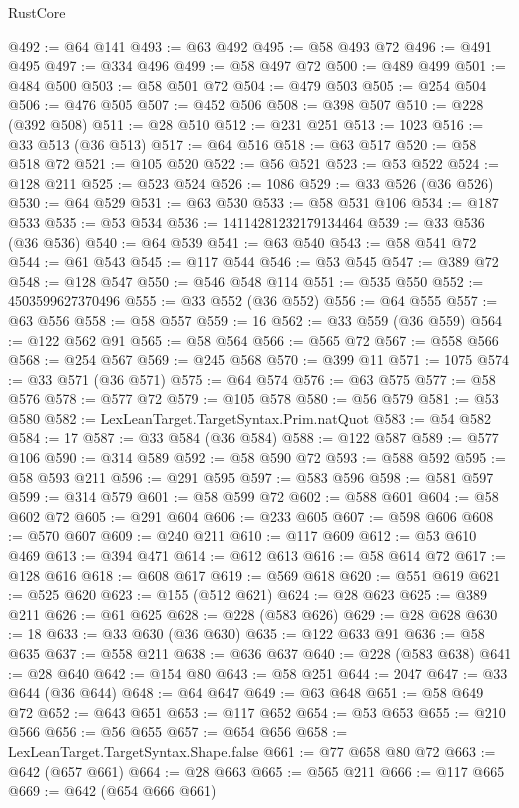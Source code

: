 \begin{lexlean}{RustCore}
\begin{coremodule}
@492 := @64 @141
@493 := @63 @492
@495 := @58 @493 @72
@496 := @491 @495
@497 := @334 @496
@499 := @58 @497 @72
@500 := @489 @499
@501 := @484 @500
@503 := @58 @501 @72
@504 := @479 @503
@505 := @254 @504
@506 := @476 @505
@507 := @452 @506
@508 := @398 @507
@510 := @228 (@392 @508)
@511 := @28 @510
@512 := @231 @251
@513 := 1023
@516 := @33 @513 (@36 @513)
@517 := @64 @516
@518 := @63 @517
@520 := @58 @518 @72
@521 := @105 @520
@522 := @56 @521
@523 := @53 @522
@524 := @128 @211
@525 := @523 @524
@526 := 1086
@529 := @33 @526 (@36 @526)
@530 := @64 @529
@531 := @63 @530
@533 := @58 @531 @106
@534 := @187 @533
@535 := @53 @534
@536 := 14114281232179134464
@539 := @33 @536 (@36 @536)
@540 := @64 @539
@541 := @63 @540
@543 := @58 @541 @72
@544 := @61 @543
@545 := @117 @544
@546 := @53 @545
@547 := @389 @72
@548 := @128 @547
@550 := @546 @548 @114
@551 := @535 @550
@552 := 4503599627370496
@555 := @33 @552 (@36 @552)
@556 := @64 @555
@557 := @63 @556
@558 := @58 @557
@559 := 16
@562 := @33 @559 (@36 @559)
@564 := @122 @562 @91
@565 := @58 @564
@566 := @565 @72
@567 := @558 @566
@568 := @254 @567
@569 := @245 @568
@570 := @399 @11
@571 := 1075
@574 := @33 @571 (@36 @571)
@575 := @64 @574
@576 := @63 @575
@577 := @58 @576
@578 := @577 @72
@579 := @105 @578
@580 := @56 @579
@581 := @53 @580
@582 := LexLeanTarget.TargetSyntax.Prim.natQuot
@583 := @54 @582
@584 := 17
@587 := @33 @584 (@36 @584)
@588 := @122 @587
@589 := @577 @106
@590 := @314 @589
@592 := @58 @590 @72
@593 := @588 @592
@595 := @58 @593 @211
@596 := @291 @595
@597 := @583 @596
@598 := @581 @597
@599 := @314 @579
@601 := @58 @599 @72
@602 := @588 @601
@604 := @58 @602 @72
@605 := @291 @604
@606 := @233 @605
@607 := @598 @606
@608 := @570 @607
@609 := @240 @211
@610 := @117 @609
@612 := @53 @610 @469
@613 := @394 @471
@614 := @612 @613
@616 := @58 @614 @72
@617 := @128 @616
@618 := @608 @617
@619 := @569 @618
@620 := @551 @619
@621 := @525 @620
@623 := @155 (@512 @621)
@624 := @28 @623
@625 := @389 @211
@626 := @61 @625
@628 := @228 (@583 @626)
@629 := @28 @628
@630 := 18
@633 := @33 @630 (@36 @630)
@635 := @122 @633 @91
@636 := @58 @635
@637 := @558 @211
@638 := @636 @637
@640 := @228 (@583 @638)
@641 := @28 @640
@642 := @154 @80
@643 := @58 @251
@644 := 2047
@647 := @33 @644 (@36 @644)
@648 := @64 @647
@649 := @63 @648
@651 := @58 @649 @72
@652 := @643 @651
@653 := @117 @652
@654 := @53 @653
@655 := @210 @566
@656 := @56 @655
@657 := @654 @656
@658 := LexLeanTarget.TargetSyntax.Shape.false
@661 := @77 @658 @80 @72
@663 := @642 (@657 @661)
@664 := @28 @663
@665 := @565 @211
@666 := @117 @665
@669 := @642 (@654 @666 @661)

\end{coremodule}
\end{lexlean}
